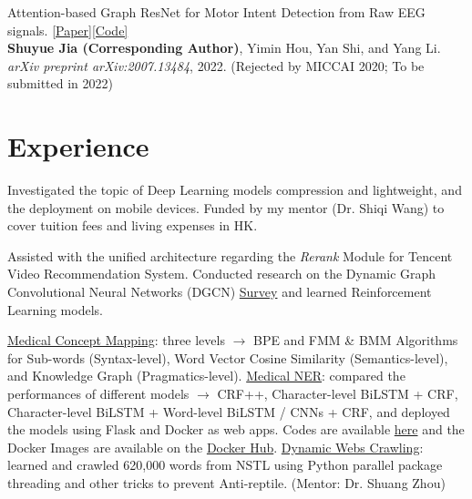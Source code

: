 \documentclass{my_cv}
\begin{document}
\hspace*{\fill}

\workitemsone
{Attention-based Graph ResNet for Motor Intent Detection from Raw EEG signals. \href{https://arxiv.org/abs/2007.13484}{[Paper]}\href{https://github.com/SuperBruceJia/EEG-DL}{[Code]}\\
	\textbf{Shuyue Jia (Corresponding Author)}, Yimin Hou, Yan Shi, and Yang Li.\\
	\emph{arXiv preprint arXiv:2007.13484}, 2022. (Rejected by MICCAI 2020; To be submitted in 2022)
}
	
\hspace*{\fill}

\section{Experience}

\workitemstwo
{Investigated the topic of Deep Learning models compression and lightweight, and the deployment on mobile devices.}
{Funded by my mentor (Dr. Shiqi Wang) to cover tuition fees and living expenses in HK.}

\hspace*{\fill} 

\workitemstwo
{Assisted with the unified architecture regarding the \emph{Rerank} Module for Tencent Video Recommendation System.}
{Conducted research on the Dynamic Graph Convolutional Neural Networks (DGCN) \href{https://shuyuej.com/files/Dynamic-GCN-Survey.pdf}{Survey} and learned Reinforcement Learning models.}

\hspace*{\fill} 

\workitemsthree
{\href{https://github.com/SuperBruceJia/Medical-Concept-Mapping}{Medical Concept Mapping}: three levels $\rightarrow$ BPE and FMM \& BMM Algorithms for Sub-words (Syntax-level), Word Vector Cosine Similarity (Semantics-level), and Knowledge Graph (Pragmatics-level).}
{\href{https://github.com/SuperBruceJia/MedicalNER}{Medical NER}: compared the performances of different models $\rightarrow$ CRF++, Character-level BiLSTM + CRF, Character-level BiLSTM + Word-level BiLSTM / CNNs + CRF, and deployed the models using Flask and Docker as web apps. Codes are available \href{https://github.com/SuperBruceJia/pytorch-flask-deploy-webapp}{here} and the Docker Images are available on the \href{https://hub.docker.com/u/shuyuej}{Docker Hub}.}
{\href{https://github.com/SuperBruceJia/dynamic-web-crawlering-python}{Dynamic Webs Crawling}: learned and crawled 620,000 words from NSTL using Python parallel package threading and other tricks to prevent Anti-reptile. (Mentor: Dr. Shuang Zhou)}
\end{document}
